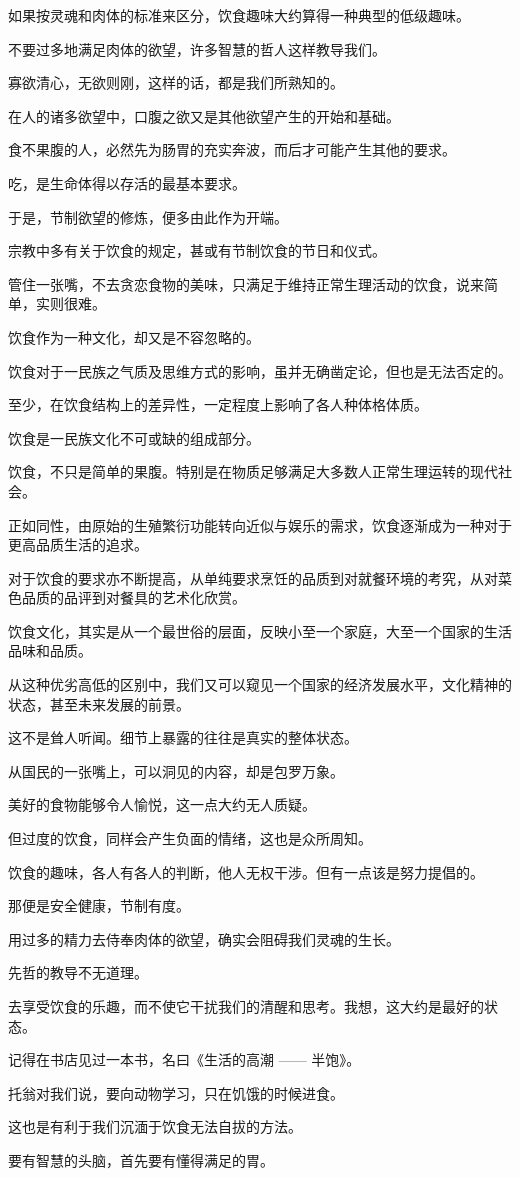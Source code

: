 \documentclass[12pt,a4paper]{article}
\begin{document}
	\endwriting



		如果按灵魂和肉体的标准来区分，饮食趣味大约算得一种典型的低级趣味。\par
		不要过多地满足肉体的欲望，许多智慧的哲人这样教导我们。\par
		寡欲清心，无欲则刚，这样的话，都是我们所熟知的。\par
		在人的诸多欲望中，口腹之欲又是其他欲望产生的开始和基础。\par
		食不果腹的人，必然先为肠胃的充实奔波，而后才可能产生其他的要求。\par
		吃，是生命体得以存活的最基本要求。\par
		于是，节制欲望的修炼，便多由此作为开端。\par
		宗教中多有关于饮食的规定，甚或有节制饮食的节日和仪式。\par
		管住一张嘴，不去贪恋食物的美味，只满足于维持正常生理活动的饮食，说来简单，实则很难。

		饮食作为一种文化，却又是不容忽略的。\par
		饮食对于一民族之气质及思维方式的影响，虽并无确凿定论，但也是无法否定的。\par
		至少，在饮食结构上的差异性，一定程度上影响了各人种体格体质。\par
		饮食是一民族文化不可或缺的组成部分。\par
		饮食，不只是简单的果腹。特别是在物质足够满足大多数人正常生理运转的现代社会。\par
		正如同性，由原始的生殖繁衍功能转向近似与娱乐的需求，饮食逐渐成为一种对于更高品质生活的追求。\par
		对于饮食的要求亦不断提高，从单纯要求烹饪的品质到对就餐环境的考究，从对菜色品质的品评到对餐具的艺术化欣赏。\par
		饮食文化，其实是从一个最世俗的层面，反映小至一个家庭，大至一个国家的生活品味和品质。\par
		从这种优劣高低的区别中，我们又可以窥见一个国家的经济发展水平，文化精神的状态，甚至未来发展的前景。\par
		这不是耸人听闻。细节上暴露的往往是真实的整体状态。\par
		从国民的一张嘴上，可以洞见的内容，却是包罗万象。

		美好的食物能够令人愉悦，这一点大约无人质疑。\par
		但过度的饮食，同样会产生负面的情绪，这也是众所周知。\par
		饮食的趣味，各人有各人的判断，他人无权干涉。但有一点该是努力提倡的。\par
		那便是安全健康，节制有度。\par
		用过多的精力去侍奉肉体的欲望，确实会阻碍我们灵魂的生长。\par
		先哲的教导不无道理。\par
		去享受饮食的乐趣，而不使它干扰我们的清醒和思考。我想，这大约是最好的状态。\par
		记得在书店见过一本书，名曰《生活的高潮 —— 半饱》。\par
		托翁对我们说，要向动物学习，只在饥饿的时候进食。\par
		这也是有利于我们沉湎于饮食无法自拔的方法。\par
		要有智慧的头脑，首先要有懂得满足的胃。
\end{document}
